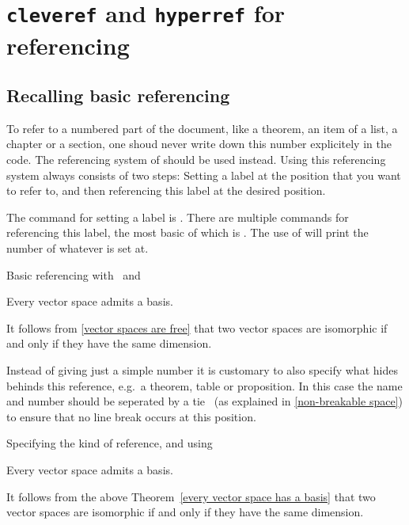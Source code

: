 \section{\texttt{cleveref} and \texttt{hyperref} for referencing}



\subsection{Recalling basic referencing}

To refer to a numbered part of the document, like a theorem, an item of a list, a chapter or a section, one shoud never write down this number explicitely in the code.
The referencing system of  should be used instead.
Using this referencing system always consists of two steps:
Setting a label at the position that you want to refer to, and then referencing this label at the desired position.

The command for setting a label is .
There are multiple commands for referencing this label, the most basic of which is .
The use of  will print the number of whatever  is set at.
\begin{showlatex}{Basic referencing with~ and~}
\begin{theorem}
  \label{vector spaces are free}
  Every vector space admits a basis.
\end{theorem}
It follows from \ref{vector spaces are free} that two vector spaces are isomorphic if and only if they have the same dimension.
\end{showlatex}

Instead of giving just a simple number it is customary to also specify what hides behinds this reference, e.g.\ a theorem, table or proposition.
In this case the name and number should be seperated by a tie~\inlinecode{\customtexttilde} (as explained in \cref{non-breakable space}) to ensure that no line break occurs at this position.
\begin{showlatex}{Specifying the kind of reference, and using~\inlinecode{\customtexttilde}}
\begin{theorem}
  \label{every vector space has a basis}
  Every vector space admits a basis.
\end{theorem}
It follows from the above Theorem~\ref{every vector space has a basis} that two vector spaces are isomorphic if and only if they have the same dimension.
\end{showlatex}


